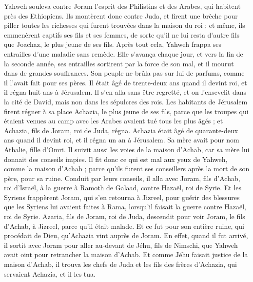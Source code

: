 \begin{multicols}{2}
Yahweh souleva contre Joram l'esprit des Philistins et des Arabes, qui habitent près des Ethiopiens.
Ils montèrent donc contre Juda, et firent une brèche pour piller toutes les richesses qui furent trouvées dans la maison du roi ; et même, ils emmenèrent captifs ses fils et ses femmes, de sorte qu'il ne lui resta d'autre fils que Joachaz, le plus jeune de ses fils.
Après tout cela, Yahweh frappa ses entrailles d'une maladie sans remède.
Elle s'avança chaque jour, et vers la fin de la seconde année, ses entrailles sortirent par la force de son mal, et il mourut dans de grandes souffrances. Son peuple ne brûla pas sur lui de parfums, comme il l'avait fait pour ses pères.
Il était âgé de trente-deux ans quand il devint roi, et il régna huit ans à Jérusalem. Il s'en alla sans être regretté, et on l'ensevelit dans la cité de David, mais non dans les sépulcres des rois.
\VerseOne{}Les habitants de Jérusalem firent régner à sa place Achazia, le plus jeune de ses fils, parce que les troupes qui étaient venues au camp avec les Arabes avaient tué tous les plus âgés ; et Achazia, fils de Joram, roi de Juda, régna.
Achazia était âgé de quarante-deux ans quand il devint roi, et il régna un an à Jérusalem. Sa mère avait pour nom Athalie, fille d'Omri.
Il suivit aussi les voies de la maison d'Achab, car sa mère lui donnait des conseils impies.
Il fit donc ce qui est mal aux yeux de Yahweh, comme la maison d'Achab ; parce qu'ils furent ses conseillers après la mort de son père, pour sa ruine.
Conduit par leurs conseils, il alla avec Joram, fils d'Achab, roi d'Israël, à la guerre à Ramoth de Galaad, contre Hazaël, roi de Syrie. Et les Syriens frappèrent Joram,
qui s'en retourna à Jizreel, pour guérir des blessures que les Syriens lui avaient faites à Rama, lorsqu'il faisait la guerre contre Hazaël, roi de Syrie. Azaria, fils de Joram, roi de Juda, descendit pour voir Joram, le fils d'Achab, à Jizreel, parce qu'il était malade.
Et ce fut pour son entière ruine, qui procédait de Dieu, qu'Achazia vint auprès de Joram. En effet, quand il fut arrivé, il sortit avec Joram pour aller au-devant de Jéhu, fils de Nimschi, que Yahweh avait oint pour retrancher la maison d'Achab.
Et comme Jéhu faisait justice de la maison d'Achab, il trouva les chefs de Juda et les fils des frères d'Achazia, qui servaient Achazia, et il les tua.

\end{multicols}

